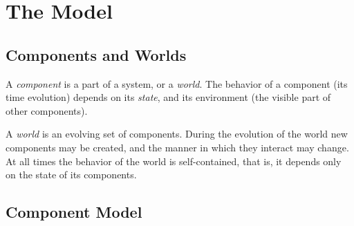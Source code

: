 



%
%
%
%


\section{The Model\label{model}}

\subsection{Components and Worlds}

A {\em component} is a part of a system, or a {\em world}.  The
behavior of a component (its time evolution) depends on its
{\em state}, and its environment (the visible part of other
components).

A {\em world} is an evolving set of components.  During the evolution
of the world new components may be created, and the manner
in which they interact may change.  At all times the behavior of the
world is self-contained, that is, it depends only on the state of its
components.

\subsection{Component Model}

